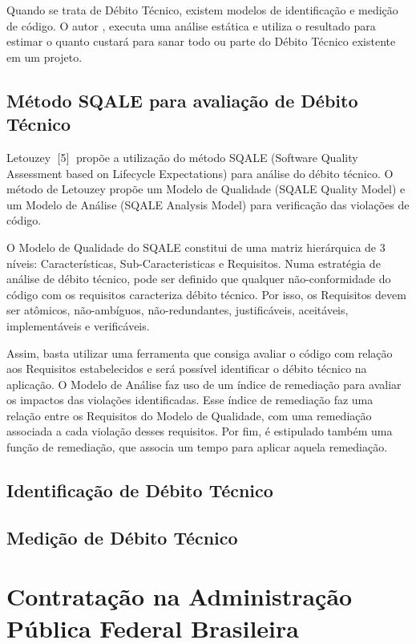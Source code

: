 Quando se trata de Débito Técnico, existem modelos de identificação e medição de
código. O autor \cite{eisenberg}, executa uma análise estática e utiliza o
resultado para estimar o quanto custará para sanar todo ou parte do Débito
Técnico existente em um projeto.



\subsection{Método SQALE para avaliação de Débito Técnico}
Letouzey [5] propõe a utilização do método SQALE (Software Quality Assessment
based on Lifecycle Expectations) para análise do débito técnico. O método de
Letouzey propõe um Modelo de Qualidade (SQALE Quality Model) e um Modelo de
Análise (SQALE Analysis Model) para verificação das violações de código.

O Modelo de Qualidade do SQALE constitui de uma matriz hierárquica de 3 níveis:
Características, Sub-Caracteristicas e Requisitos. Numa estratégia de análise de
débito técnico, pode ser definido que qualquer não-conformidade do código com os
requisitos caracteriza débito técnico. Por isso, os Requisitos devem ser atômicos,
não-ambíguos, não-redundantes, justificáveis, aceitáveis, implementáveis e
verificáveis.

Assim, basta utilizar uma ferramenta que consiga avaliar o código com relação aos Requisitos estabelecidos e será possível identificar o débito técnico na aplicação.
O Modelo de Análise faz uso de um índice de remediação para avaliar os impactos das violações identificadas. Esse índice de remediação faz uma relação entre os Requisitos do Modelo de Qualidade, com uma remediação associada a cada violação desses requisitos. Por fim, é estipulado também uma função de remediação, que associa um tempo para aplicar aquela remediação.

\subsection{Identificação de Débito Técnico}
\subsection{Medição de Débito Técnico}

\section{Contratação na Administração Pública Federal Brasileira}
